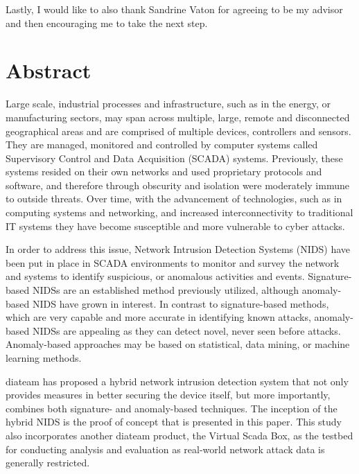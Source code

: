 \documentclass[11pt,a4paper]{article}
\begin{document}
Lastly, I would like to also thank Sandrine Vaton for agreeing to be my
advisor and then encouraging me to take the next step.

\newpage
\mbox{} \thispagestyle{empty}

\clearpage

\section*{Abstract}\label{abstract}

Large scale, industrial processes and infrastructure, such as in the
energy, or manufacturing sectors, may span across multiple, large,
remote and disconnected geographical areas and are comprised of multiple
devices, controllers and sensors. They are managed, monitored and
controlled by computer systems called Supervisory Control and Data
Acquisition (SCADA) systems. Previously, these systems resided on their
own networks and used proprietary protocols and software, and therefore
through obscurity and isolation were moderately immune to outside
threats. Over time, with the advancement of technologies, such as in
computing systems and networking, and increased interconnectivity to
traditional IT systems they have become susceptible and more vulnerable
to cyber attacks.

In order to address this issue, Network Intrusion Detection Systems
(NIDS) have been put in place in SCADA environments to monitor and
survey the network and systems to identify suspicious, or anomalous
activities and events. Signature-based NIDSs are an established method
previously utilized, although anomaly-based NIDS have grown in interest.
In contrast to signature-based methods, which are very capable and more
accurate in identifying known attacks, anomaly-based NIDSs are appealing
as they can detect novel, never seen before attacks. Anomaly-based
approaches may be based on statistical, data mining, or machine learning
methods.

diateam has proposed a hybrid network intrusion detection system that
not only provides measures in better securing the device itself, but
more importantly, combines both signature- and anomaly-based techniques.
The inception of the hybrid NIDS is the proof of concept that is
presented in this paper. This study also incorporates another diateam
product, the Virtual Scada Box, as the testbed for conducting analysis
and evaluation as real-world network attack data is generally
restricted.
\end{document}
